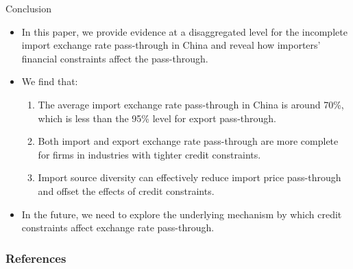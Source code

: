 \documentclass[10pt]{beamer}
\begin{document}
\begin{frame}{Conclusion}
	\begin{itemize}
		\item In this paper, we provide evidence at a disaggregated level for the incomplete import exchange rate pass-through in China and reveal how importers’ financial constraints affect the pass-through.
		\item We find that:
		\begin{enumerate}
			\item The average import exchange rate pass-through in China is around 70\%, which is less than the 95\% level for export pass-through.
			\item Both import and export exchange rate pass-through are more complete for firms in industries with tighter credit constraints.
			\item Import source diversity can effectively reduce import price pass-through and offset the effects of credit constraints.
		\end{enumerate}
		\item In the future, we need to explore the underlying mechanism by which credit constraints affect exchange rate pass-through. 
	\end{itemize}
\end{frame}

\begin{frame}[allowframebreaks]
	\frametitle{References}
	
	\footnotesize
	
\end{frame}
	
\end{document}
